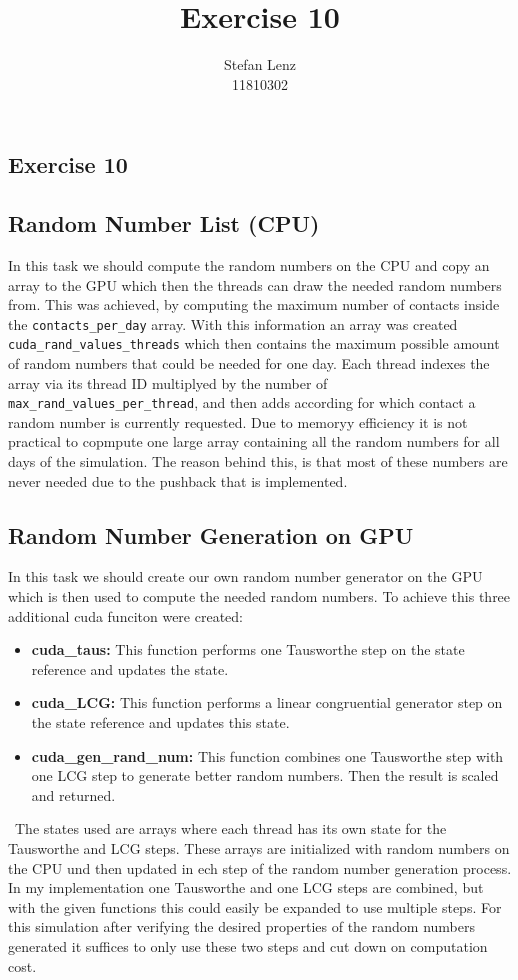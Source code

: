 \documentclass[12pt,a4paper]{article}
\title{Exercise 10}
\author{Stefan Lenz\\11810302}
\date{}
\begin{document}
\begin{center}
  \section*{Exercise 10}
\end{center}
\subsection*{Random Number List (CPU)}
In this task we should compute the random numbers on the CPU and copy an array to the GPU which then the threads can draw the needed random  numbers from. This was achieved, by computing the maximum number of contacts inside the \lstinline|contacts_per_day| array. With this information an array was created \lstinline|cuda_rand_values_threads| which then contains the maximum possible amount of random numbers that could be needed for one day. Each thread indexes the array via its thread ID multiplyed by the number of \lstinline|max_rand_values_per_thread|, and then adds according for which contact a random number is currently requested. Due to memoryy efficiency it is not practical to copmpute one large array containing all the random numbers for all days of the simulation. The reason behind this, is that most of these numbers are never needed due to the pushback that is implemented.
\subsection*{Random Number Generation on GPU}
In this task we should create our own random number generator on the GPU which is then used to compute the needed random numbers. To achieve this three additional cuda funciton were created:
\begin{itemize}
  \item \textbf{cuda\_taus: } This function performs one Tausworthe step on the state reference and updates the state.
  \item \textbf{cuda\_LCG: } This function performs a linear congruential generator step on the state reference and updates this state.
  \item \textbf{cuda\_gen\_rand\_num: } This function combines one Tausworthe step with one LCG step to generate better random numbers. Then the result is scaled and returned.
\end{itemize}\
The states used are arrays where each thread has its own state for the Tausworthe and LCG steps. These arrays are initialized with random numbers on the CPU und then updated in ech step of the random number generation process. In my implementation one Tausworthe and one LCG steps are combined, but with the given functions this could easily be expanded to use multiple steps. For this simulation after verifying the desired properties of the random numbers generated it suffices to only use these two steps and cut down on computation cost. 
\end{document}
